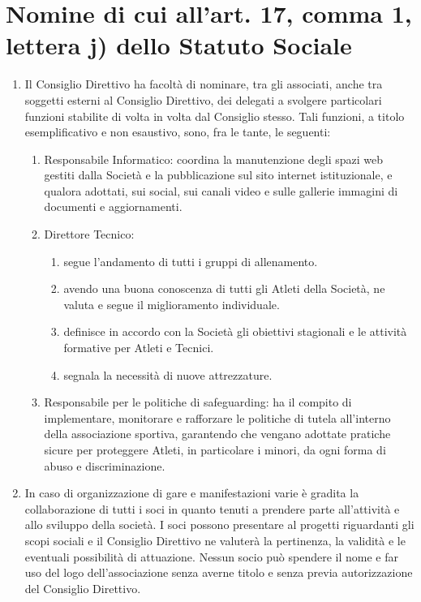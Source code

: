 \documentclass{djtsdoc}
\begin{document}
	\section{Nomine di cui all'art. 17, comma 1, lettera j) dello Statuto Sociale}
	\begin{enumerate}
		\item Il Consiglio Direttivo ha facoltà di nominare, tra gli associati, anche tra soggetti esterni al Consiglio Direttivo, dei delegati a svolgere particolari funzioni stabilite di volta in  volta dal Consiglio stesso. Tali funzioni, a titolo esemplificativo e non esaustivo, sono, fra le tante, le seguenti:
		\begin{enumerate}
			\item Responsabile Informatico: coordina la manutenzione degli spazi web gestiti dalla Società e la pubblicazione sul sito internet istituzionale, e qualora adottati, sui social, sui canali video e sulle gallerie immagini di documenti e aggiornamenti.
			\item Direttore Tecnico: 
			\begin{enumerate}
				\item segue l'andamento di tutti i gruppi di allenamento.
				\item avendo una buona conoscenza di tutti gli Atleti della Società, ne valuta e segue il miglioramento individuale.
				\item definisce in accordo con la Società gli obiettivi stagionali e le attività formative per Atleti e Tecnici.
				\item segnala la necessità di nuove attrezzature.
			\end{enumerate}
			\item Responsabile per le politiche di safeguarding: ha il compito di implementare, monitorare e rafforzare le politiche di tutela all'interno della associazione sportiva, garantendo che vengano adottate pratiche sicure per proteggere Atleti, in particolare i minori, da ogni forma di abuso e discriminazione.
		\end{enumerate}
		\item In caso di organizzazione di gare e manifestazioni varie è gradita la collaborazione di tutti i soci in quanto tenuti a prendere parte all'attività e allo sviluppo della società. I soci possono presentare al progetti riguardanti gli scopi sociali e il Consiglio Direttivo ne valuterà la pertinenza, la validità e le eventuali possibilità di attuazione. Nessun socio può spendere il nome e far uso del logo dell'associazione senza averne titolo e senza previa autorizzazione del Consiglio Direttivo.
	\end{enumerate}
	
\end{document}
